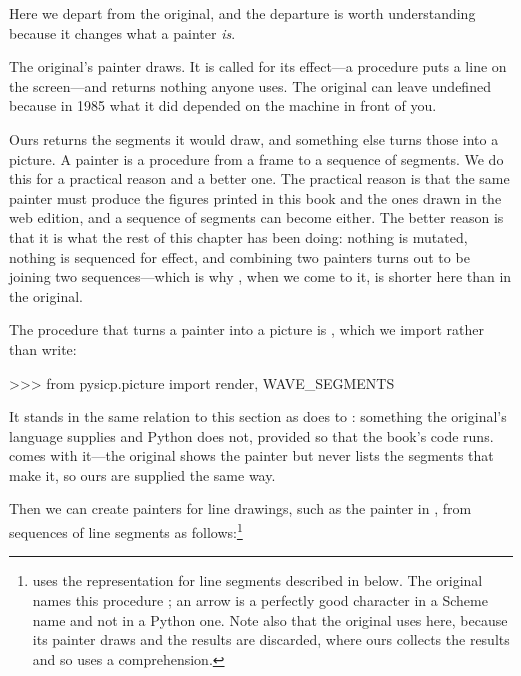 \begin{notTaste}
Here we depart from the original, and the departure is worth understanding
because it changes what a painter \emph{is}.

The original's painter draws.  It is called for its effect---a procedure
 puts a line on the screen---and returns nothing anyone uses.
The original can leave  undefined because in 1985 what it did
depended on the machine in front of you.

Ours returns the segments it would draw, and something else turns those into a
picture.  A painter is a procedure from a frame to a sequence of segments.  We
do this for a practical reason and a better one.  The practical reason is that
the same painter must produce the figures printed in this book and the ones
drawn in the web edition, and a sequence of segments can become either.  The
better reason is that it is what the rest of this chapter has been doing:
nothing is mutated, nothing is sequenced for effect, and combining two painters
turns out to be joining two sequences---which is why , when we
come to it, is shorter here than in the original.

The procedure that turns a painter into a picture is , which we
import rather than write:

\begin{codeBlock}
>>> from pysicp.picture import render, WAVE_SEGMENTS
\end{codeBlock}

\noindent
It stands in the same relation to this section as  does
to : something the original's language supplies and Python does
not, provided so that the book's code runs.   comes with
it---the original shows the  painter but never lists the segments
that make it, so ours are supplied the same way.
\end{notTaste}

Then we can create painters for line drawings, such as the  painter
in , from sequences of line segments as
follows:\footnote{ uses the representation for line
segments described in  below.  The original names this
procedure ; an arrow is a perfectly good character in a
Scheme name and not in a Python one.  Note also that the original uses
 here, because its painter draws and the results are discarded,
where ours collects the results and so uses a comprehension.}

